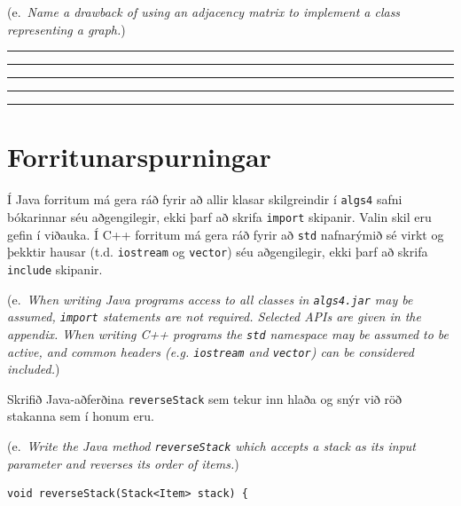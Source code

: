 \documentclass[addpoints]{exam}
\newcommand{\eng}[1]{(e.\ \emph{#1})}
\begin{document}
\begin{questions}
\begin{parts}
		\eng{Name a drawback of using an adjacency matrix to implement a class representing a graph.}

		\vspace*{1cm} \hrule \vspace*{1cm} \hrule \vspace*{1cm} \hrule \vspace*{1cm} \hrule \vspace*{1cm} \hrule

	\end{parts}

	\newpage

	\section{Forritunarspurningar}

	Í Java forritum má gera ráð fyrir að allir klasar skilgreindir í \texttt{algs4} safni bókarinnar séu aðgengilegir, ekki þarf að skrifa \texttt{import} skipanir. Valin skil eru gefin í viðauka. Í C++ forritum má gera ráð fyrir að \texttt{std} nafnarýmið sé virkt og þekktir hausar (t.d. \texttt{iostream} og \texttt{vector}) séu aðgengilegir, ekki þarf að skrifa \texttt{include} skipanir.

	\eng{When writing Java programs access to all classes in \texttt{algs4.jar} may be assumed, \texttt{import} statements are not required. Selected APIs are given in the appendix. When writing C++ programs the \texttt{std} namespace may be assumed to be active, and common headers (e.g. \texttt{iostream} and \texttt{vector}) can be considered included.}

	\question[4] Skrifið Java-aðferðina \texttt{reverseStack} sem tekur inn hlaða og snýr við röð stakanna sem í honum eru.

	\eng{Write the Java method \texttt{reverseStack} which accepts a stack as its input parameter and reverses its order of items.}

	\begin{verbatim}
void reverseStack(Stack<Item> stack) {






































\end{verbatim}
\end{questions}
\end{document}
